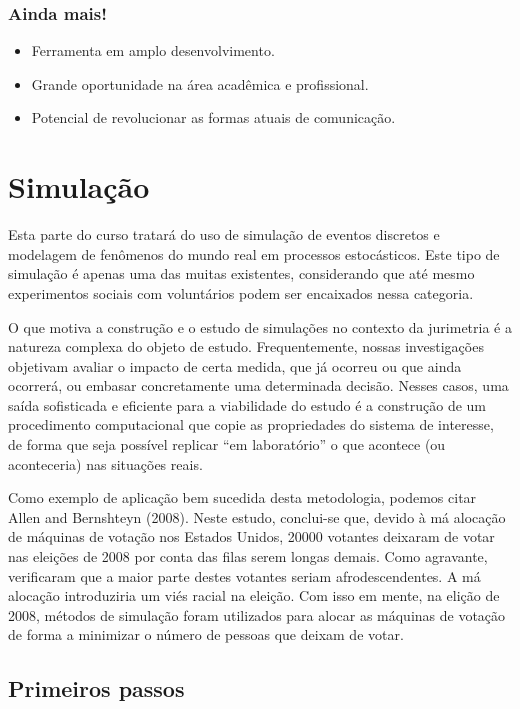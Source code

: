 \documentclass[]{book}
\providecommand{\tightlist}{%
  \setlength{\itemsep}{0pt}\setlength{\parskip}{0pt}}
\begin{document}
\subsection{Ainda mais!}\label{ainda-mais}

\begin{itemize}
\tightlist
\item
  Ferramenta em amplo desenvolvimento.
\item
  Grande oportunidade na área acadêmica e profissional.
\item
  Potencial de revolucionar as formas atuais de comunicação.
\end{itemize}

\chapter{Simulação}\label{simulacao}

Esta parte do curso tratará do uso de simulação de eventos discretos e
modelagem de fenômenos do mundo real em processos estocásticos. Este
tipo de simulação é apenas uma das muitas existentes, considerando que
até mesmo experimentos sociais com voluntários podem ser encaixados
nessa categoria.

O que motiva a construção e o estudo de simulações no contexto da
jurimetria é a natureza complexa do objeto de estudo. Frequentemente,
nossas investigações objetivam avaliar o impacto de certa medida, que já
ocorreu ou que ainda ocorrerá, ou embasar concretamente uma determinada
decisão. Nesses casos, uma saída sofisticada e eficiente para a
viabilidade do estudo é a construção de um procedimento computacional
que copie as propriedades do sistema de interesse, de forma que seja
possível replicar ``em laboratório'' o que acontece (ou aconteceria) nas
situações reais.

Como exemplo de aplicação bem sucedida desta metodologia, podemos citar
Allen and Bernshteyn (2008). Neste estudo, conclui-se que, devido à má
alocação de máquinas de votação nos Estados Unidos, 20000 votantes
deixaram de votar nas eleições de 2008 por conta das filas serem longas
demais. Como agravante, verificaram que a maior parte destes votantes
seriam afrodescendentes. A má alocação introduziria um viés racial na
eleição. Com isso em mente, na elição de 2008, métodos de simulação
foram utilizados para alocar as máquinas de votação de forma a minimizar
o número de pessoas que deixam de votar.

\section{Primeiros passos}\label{primeiros-passos}
\end{document}
